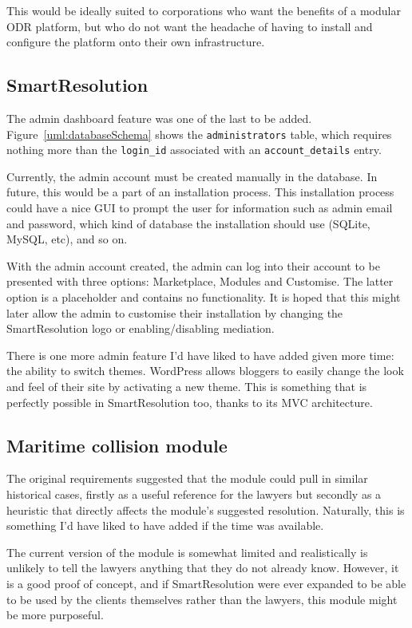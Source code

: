 This would be ideally suited to corporations who want the benefits of a modular ODR platform, but who do not want the headache of having to install and configure the platform onto their own infrastructure.

\subsection{SmartResolution}

The admin dashboard feature was one of the last to be added. Figure~\ref{uml:databaseSchema} shows the \lstinline{administrators} table, which requires nothing more than the \lstinline{login_id} associated with an \lstinline{account_details} entry.

Currently, the admin account must be created manually in the database. In future, this would be a part of an installation process. This installation process could have a nice GUI to prompt the user for information such as admin email and password, which kind of database the installation should use (SQLite, MySQL, etc), and so on.

With the admin account created, the admin can log into their account to be presented with three options: Marketplace, Modules and Customise. The latter option is a placeholder and contains no functionality. It is hoped that this might later allow the admin to customise their installation by changing the SmartResolution logo or enabling/disabling mediation.

There is one more admin feature I'd have liked to have added given more time: the ability to switch themes. WordPress allows bloggers to easily change the look and feel of their site by activating a new theme. This is something that is perfectly possible in SmartResolution too, thanks to its MVC architecture.

\subsection{Maritime collision module}

The original requirements suggested that the module could pull in similar historical cases, firstly as a useful reference for the lawyers but secondly as a heuristic that directly affects the module's suggested resolution. Naturally, this is something I'd have liked to have added if the time was available.

The current version of the module is somewhat limited and realistically is unlikely to tell the lawyers anything that they do not already know. However, it is a good proof of concept, and if SmartResolution were ever expanded to be able to be used by the clients themselves rather than the lawyers, this module might be more purposeful.

